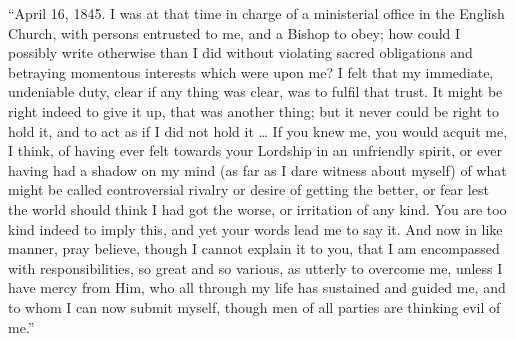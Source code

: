 ``April 16, 1845. I was at that time in charge of a ministerial
office in the English Church, with persons entrusted to me, and a Bishop
to obey; how could I possibly write otherwise than I did without
violating sacred obligations and betraying momentous interests which
were upon me? I felt that my immediate, undeniable duty, clear if any thing
was clear, was to fulfil that trust. It might be right indeed to give it
up, that was another thing; but it never could be right to hold it, and
to act as if I did not hold it … If you knew me, you would acquit me,
I think, of having ever felt towards your Lordship in an
unfriendly spirit, or ever having had a shadow on my mind (as far as I
dare witness about myself) of what might be called controversial
rivalry or desire of getting the better, or fear lest the world should
think I had got the worse, or irritation of any kind. You are
too kind indeed to imply this, and yet your words lead me to say it. And
now in like manner, pray believe, though I cannot explain it to you,
that I am encompassed with responsibilities, so great and so various, as
utterly to overcome me, unless I have mercy from Him, who all through my
life has sustained and guided me, and to whom I can now submit myself,
though men of all parties are thinking evil of me.''

